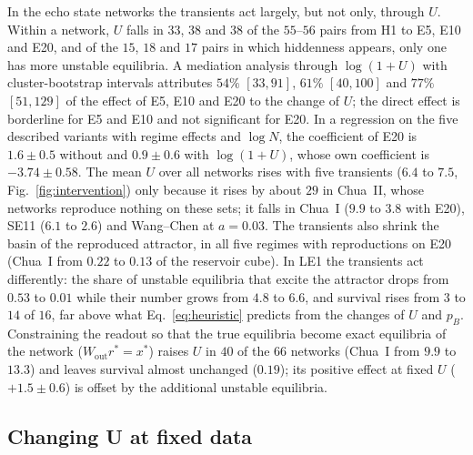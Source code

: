 \documentclass[aip,cha,reprint,amsmath,amssymb,longbibliography]{revtex4-2}
\theoremstyle{definition}
\begin{document}
In the echo state networks the transients act largely, but not only, through $U$. Within a network, $U$ falls in $33$, $38$
and $38$ of the $55$--$56$ pairs from H1 to E5, E10 and E20, and of the $15$, $18$ and $17$ pairs in which hiddenness appears,
only one has more unstable equilibria. A mediation analysis through $\log(1+U)$ with cluster-bootstrap intervals attributes
$54\%$ $[33,91]$, $61\%$ $[40,100]$ and $77\%$ $[51,129]$ of the effect of E5, E10 and E20 to the change of $U$; the direct
effect is borderline for E5 and E10 and not significant for E20. In a regression on the five described variants with regime
effects and $\log N$, the coefficient of E20 is $1.6\pm0.5$ without and $0.9\pm0.6$ with $\log(1+U)$, whose own coefficient
is $-3.74\pm0.58$. The mean $U$ over all networks rises with five transients ($6.4$ to $7.5$, Fig.~\ref{fig:intervention})
only because it rises by about $29$ in Chua~II, whose networks reproduce nothing on these sets; it falls in Chua~I ($9.9$ to
$3.8$ with E20), SE11 ($6.1$ to $2.6$) and Wang--Chen at $a=0.03$. The transients also shrink the basin of the reproduced
attractor, in all five regimes with reproductions on E20 (Chua~I from $0.22$ to $0.13$ of the reservoir cube). In LE1 the
transients act differently: the share of unstable equilibria that excite the attractor drops from $0.53$ to $0.01$ while
their number grows from $4.8$ to $6.6$, and survival rises from $3$ to $14$ of $16$, far above what
Eq.~\eqref{eq:heuristic} predicts from the changes of $U$ and $p_B$. Constraining the readout so that the true equilibria
become exact equilibria of the network ($W_{\mathrm{out}}r^*=x^*$) raises $U$ in $40$ of the $66$ networks (Chua~I from
$9.9$ to $13.3$) and leaves survival almost unchanged ($0.19$); its positive effect at fixed $U$ ($+1.5\pm0.6$) is offset by
the additional unstable equilibria.

\subsection{Changing U at fixed data}
\label{sec:penalty}
\end{document}
